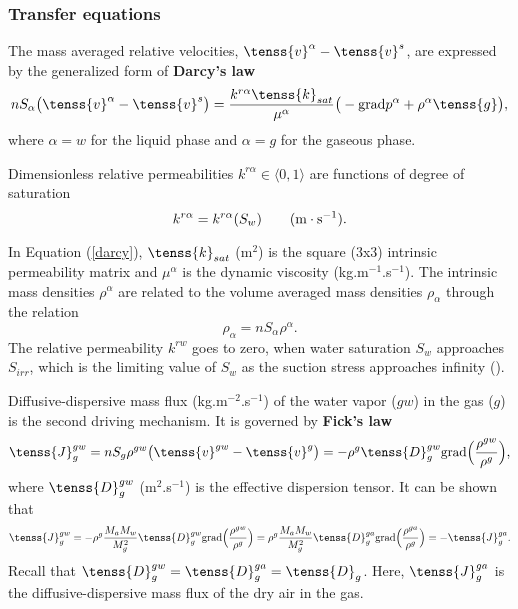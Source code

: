 \subsubsection{Transfer equations}

The mass averaged relative velocities, $\tenss{v} ^{\alpha} - \tenss{v} ^s$, are expressed 
by the generalized form of {\bf {Darcy's law}} \cite{lewis}
\begin{equation}\label{darcy}
n S_{\alpha} \big( \tenss{v} ^{\alpha} - \tenss{v} ^s \big) = \frac{k^{r\alpha} \tenss{k}_{sat}}
{\mu^{\alpha}} \big( - {\rm grad} p^{\alpha} + \rho^{\alpha} \tenss{g} \big),
\end{equation}
where $\alpha = w$ for the liquid phase and $\alpha = g$ for the gaseous phase.

Dimensionless relative permeabilities $k^{r\alpha} \in \langle 0,1 \rangle$ are functions of degree of~
saturation
\begin{equation}
k^{r\alpha} = k^{r\alpha} (S_w)\qquad ({\rm m \cdot s}^{-1}).
\end{equation}

In Equation (\ref{darcy}), $\tenss{k}_{sat}$ (m$^2$) is the square (3x3) intrinsic permeability matrix 
 and $\mu^{\alpha}$ is the dynamic viscosity (kg.m$^{-1}$.s$^{-1}$). The intrinsic mass densities $\rho^{\alpha}$ 
are related to the volume averaged mass densities $\rho_{\alpha}$ through the relation
\begin{equation}
\rho_{\alpha} = n S_{\alpha} \rho^{\alpha}.
\end{equation}
The relative permeability $k^{rw}$ goes to zero, when water saturation $S_w$ approaches $S_{irr}$, 
which is the limiting value of $S_w$ as the suction stress approaches infinity (\cite{fatt}).

Diffusive-dispersive mass flux (kg.m$^{-2}$.s$^{-1}$) of the water vapor ($gw$) in the gas
 ($g$) is the second driving mechanism. It is governed by {\bf {Fick's law}}
\begin{equation}\label{fick}
\tenss{J}^{gw}_g = n S_g \rho^{gw} \big( \tenss{v} ^{gw} - \tenss{v} ^g \big) = - \rho^g \tenss{D}^{gw}_g 
{\rm grad} \Big( \frac{\rho^{gw}}{\rho^g} \Big),
\end{equation}
where $\tenss{D}^{gw}_g$ (m$^2$.s$^{-1}$) is the effective dispersion tensor. It can be shown \\ \cite{lewis} that
\begin{equation}
\tenss{J}^{gw}_g = - \rho^g \frac{M_a M_w}{M^2_g} \tenss{D}^{gw}_g {\rm grad} \Big( \frac{\rho^{gw}}{\rho^g} \Big)
= \rho^g \frac{M_a M_w}{M^2_g} \tenss{D}^{ga}_g {\rm grad} \Big( \frac{\rho^{ga}}{\rho^g} \Big) = - \tenss{J}^{ga}_g.
\end{equation}
Recall that $\tenss{D}^{gw}_g = \tenss{D}^{ga}_g = \tenss{D}_g$.
Here, $\tenss{J}_g^{ga}$ is the diffusive-dispersive mass flux of the dry air in the gas.

